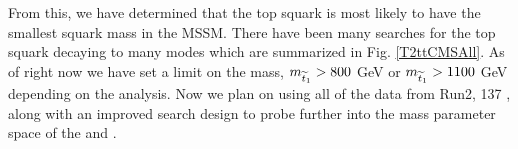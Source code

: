 From this, we have determined that the top squark is most likely to have the smallest squark mass in the MSSM. There have been many searches for the top squark decaying to many modes which are summarized in Fig. \ref{T2ttCMSAll}. As of right now we have set a limit on the \st{} mass, $m_{\widetilde{t}_1}>800$ GeV or $m_{\widetilde{t}_1}>1100$ GeV depending on the analysis. Now we plan on using all of the data from Run2, 137 \fb, along with an improved search design to probe further into the mass parameter space of the \st{} and \neutralino{}.
